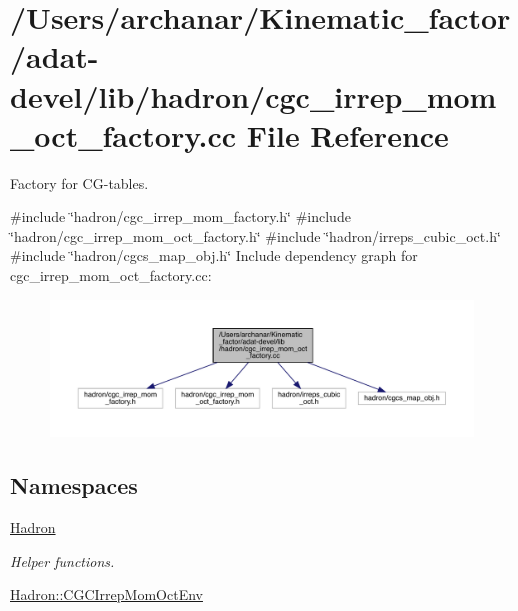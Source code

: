 \hypertarget{adat-devel_2lib_2hadron_2cgc__irrep__mom__oct__factory_8cc}{}\section{/\+Users/archanar/\+Kinematic\+\_\+factor/adat-\/devel/lib/hadron/cgc\+\_\+irrep\+\_\+mom\+\_\+oct\+\_\+factory.cc File Reference}
\label{adat-devel_2lib_2hadron_2cgc__irrep__mom__oct__factory_8cc}


Factory for C\+G-\/tables.  


{\ttfamily \#include \char`\"{}hadron/cgc\+\_\+irrep\+\_\+mom\+\_\+factory.\+h\char`\"{}}\newline
{\ttfamily \#include \char`\"{}hadron/cgc\+\_\+irrep\+\_\+mom\+\_\+oct\+\_\+factory.\+h\char`\"{}}\newline
{\ttfamily \#include \char`\"{}hadron/irreps\+\_\+cubic\+\_\+oct.\+h\char`\"{}}\newline
{\ttfamily \#include \char`\"{}hadron/cgcs\+\_\+map\+\_\+obj.\+h\char`\"{}}\newline
Include dependency graph for cgc\+\_\+irrep\+\_\+mom\+\_\+oct\+\_\+factory.\+cc\+:
\nopagebreak
\begin{figure}[H]
\begin{center}
\leavevmode
\includegraphics[width=350pt]{dd/d78/adat-devel_2lib_2hadron_2cgc__irrep__mom__oct__factory_8cc__incl}
\end{center}
\end{figure}
\subsection*{Namespaces}
\begin{DoxyCompactItemize}
\item 
 \mbox{\hyperlink{namespaceHadron}{Hadron}}
\begin{DoxyCompactList}\small\item\em Helper functions. \end{DoxyCompactList}\item 
 \mbox{\hyperlink{namespaceHadron_1_1CGCIrrepMomOctEnv}{Hadron\+::\+C\+G\+C\+Irrep\+Mom\+Oct\+Env}}
\end{DoxyCompactItemize}

